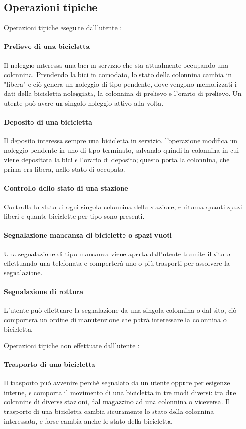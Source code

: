 \documentclass[a4paper,twoside]{article}
\begin{document}
\subsection{Operazioni tipiche}
Operazioni tipiche eseguite dall'utente :
\paragraph{Prelievo di una bicicletta} Il noleggio interessa una bici in servizio che sta attualmente occupando una colonnina. Prendendo la bici in comodato, lo stato della colonnina cambia in "libera" e ciò genera un noleggio di tipo pendente, dove vengono memorizzati i dati della bicicletta noleggiata, la colonnina di prelievo e l'orario di prelievo. Un utente può avere un singolo noleggio attivo alla volta.
\paragraph{Deposito di una bicicletta} Il deposito interessa sempre una bicicletta in servizio, l'operazione modifica un noleggio pendente in uno di tipo terminato, salvando quindi la colonnina in cui viene depositata la bici e l'orario di deposito; questo porta la colonnina, che prima era libera, nello stato di occupata.
\paragraph{Controllo dello stato di una stazione} Controlla lo stato di ogni singola colonnina della stazione, e ritorna quanti spazi liberi e quante biciclette per tipo sono presenti.
\paragraph{Segnalazione mancanza di biciclette o spazi vuoti} Una segnalazione di tipo mancanza viene aperta dall'utente tramite il sito o effettuando una telefonata e comporterà uno o più trasporti per assolvere la segnalazione.
\paragraph{Segnalazione di rottura} L'utente può effettuare la segnalazione da una singola colonnina o dal sito, ciò comporterà un ordine di manutenzione che potrà interessare la colonnina o bicicletta.
\par Operazioni tipiche non effettuate dall'utente :
\paragraph{Trasporto di una bicicletta} Il trasporto può avvenire perché segnalato da un utente oppure per esigenze interne, e comporta il movimento di una bicicletta in tre modi diversi: tra due colonnine di diverse stazioni, dal magazzino ad una colonnina o viceversa. Il trasporto di una bicicletta cambia sicuramente lo stato della colonnina interessata, e forse cambia anche lo stato della bicicletta.
\end{document}
